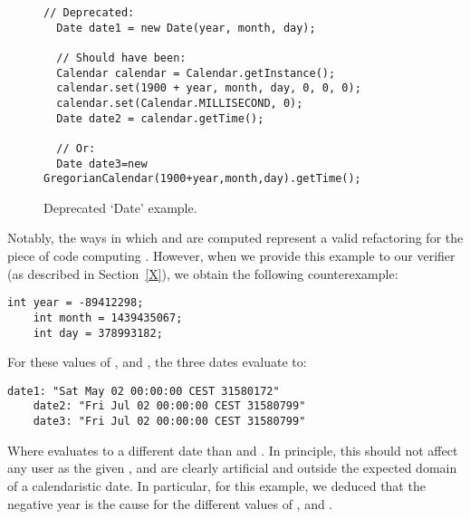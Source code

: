 \documentclass[runningheads,a4paper]{llncs}
\begin{document}

\begin{figure}
  \begin{lstlisting}[mathescape=true,showstringspaces=false]
  // Deprecated:
  Date date1 = new Date(year, month, day);

  // Should have been:
  Calendar calendar = Calendar.getInstance();
  calendar.set(1900 + year, month, day, 0, 0, 0);
  calendar.set(Calendar.MILLISECOND, 0);
  Date date2 = calendar.getTime();
    
  // Or:
  Date date3=new GregorianCalendar(1900+year,month,day).getTime();
  \end{lstlisting}
\caption{Deprecated `Date' example.}
\label{ex:three-dates}
\end{figure}

Notably, the ways in which  and  are computed
represent a valid refactoring for the piece of code computing
. However, when we provide this example to our
verifier (as described in Section~\ref{X}), we obtain the following
counterexample:

  \begin{lstlisting}[mathescape=true,showstringspaces=false]
    int year = -89412298;
    int month = 1439435067;
    int day = 378993182;
  \end{lstlisting}

  For these values of ,  and , the three
  dates evaluate to:

  \begin{lstlisting}[mathescape=true,showstringspaces=false]
    date1: "Sat May 02 00:00:00 CEST 31580172"
    date2: "Fri Jul 02 00:00:00 CEST 31580799"
    date3: "Fri Jul 02 00:00:00 CEST 31580799"
  \end{lstlisting}

  Where  evaluates to a different date than  and . In principle, this should not affect any user as the given
  ,  and  are clearly artificial and outside the expected domain of a calendaristic date.
  In particular, for this example, we deduced that the negative year is the cause for the different values of ,  and .
\end{document}
